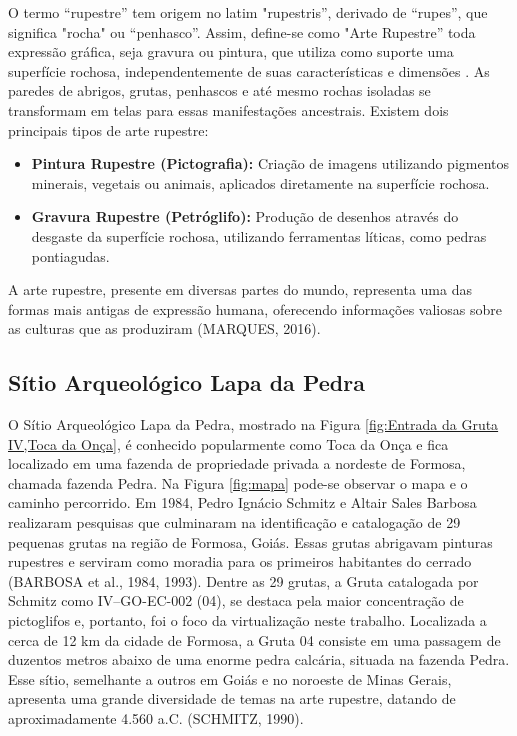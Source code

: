     O termo “rupestre” tem origem no latim "rupestris”, derivado de “rupes”, que significa "rocha" ou “penhasco”. Assim, define-se como "Arte Rupestre” toda expressão gráfica, seja gravura ou pintura, que utiliza como suporte uma superfície rochosa, independentemente de suas características e dimensões \cite[p. 7]{pedroignacioschmitz_1984_arte}. As paredes de abrigos, grutas, penhascos e até mesmo rochas isoladas se transformam em telas para essas manifestações ancestrais.
    Existem dois principais tipos de arte rupestre:
    \begin{itemize}
    \item \textbf{Pintura Rupestre (Pictografia):} Criação de imagens utilizando pigmentos minerais, vegetais ou animais, aplicados diretamente na superfície rochosa.
    \item \textbf{Gravura Rupestre (Petróglifo):} Produção de desenhos através do desgaste da superfície rochosa, utilizando ferramentas líticas, como pedras pontiagudas.
    \end{itemize}
    A arte rupestre, presente em diversas partes do mundo, representa uma das formas mais antigas de expressão humana, oferecendo informações valiosas sobre as culturas que as produziram (MARQUES, 2016).
    
    \subsection {Sítio Arqueológico Lapa da Pedra}\label{sec:sitio lapa da pedra}
    O Sítio Arqueológico Lapa da Pedra, mostrado na Figura \ref{fig:Entrada da Gruta IV,Toca da Onça}, é conhecido popularmente como Toca da Onça e fica localizado em uma fazenda de propriedade privada a nordeste de Formosa, chamada fazenda Pedra. Na Figura \ref{fig:mapa} pode-se observar o mapa e o caminho percorrido. Em 1984, Pedro Ignácio Schmitz e Altair Sales Barbosa realizaram pesquisas que culminaram na identificação e catalogação de 29 pequenas grutas na região de Formosa, Goiás. Essas grutas abrigavam pinturas rupestres e serviram como moradia para os primeiros habitantes do cerrado (BARBOSA et al., 1984, 1993).
    Dentre as 29 grutas, a Gruta catalogada por Schmitz como IV–GO-EC-002 (04), se destaca pela maior concentração de pictoglifos e, portanto, foi o foco da virtualização neste trabalho. Localizada a cerca de 12 km da cidade de Formosa, a Gruta 04 consiste em uma passagem de duzentos metros abaixo de uma enorme pedra calcária, situada na fazenda Pedra. Esse sítio, semelhante a outros em Goiás e no noroeste de Minas Gerais, apresenta uma grande diversidade de temas na arte rupestre, datando de aproximadamente 4.560 a.C. (SCHMITZ, 1990).
    
